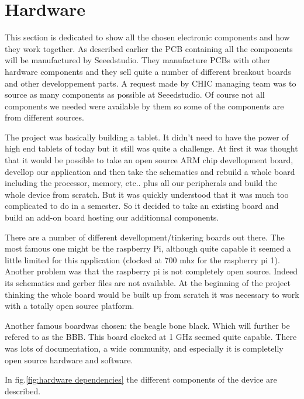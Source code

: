 \section{Hardware}

This section is dedicated to show all the chosen electronic components and how they work together. As described earlier the PCB containing all the components will be manufactured by Seeedstudio. They manufacture PCBs with other hardware components and they sell quite a number of different breakout boards and other developpement parts. A request made by CHIC managing team was to source as many components as possible at Seeedstudio. Of course not all components we needed were available by them so some of the components are from different sources.

The project was basically building a tablet. It didn't need to have the power of high end tablets of today but it still was quite a challenge. At first it was thought that it would be possible to take an open source ARM chip devellopment board, devellop our application and then take the schematics and rebuild a whole board including the processor, memory, etc.. plus all our peripherals and build the whole device from scratch. But it was quickly understood that it was much too complicated to do in a semester. So it decided to take an existing board and build an add-on board hosting our additionnal components.

There are a number of different devellopment/tinkering boards out there. The most famous one might be the raspberry Pi, although quite capable it seemed a little limited for this application (clocked at 700 mhz for the raspberry pi 1). Another problem was that the raspberry pi is not completely open source. Indeed its schematics and gerber files are not available. At the beginning of the project thinking the whole board would be built up from scratch it was necessary to work with a totally open source platform.

 Another famous boardwas chosen: the beagle bone black. Which will further be refered to as the BBB. This board clocked at 1 GHz seemed quite capable. There was lots of documentation, a wide community, and especially it is completelly open source hardware and software.

In fig.\ref{fig:hardware dependencies} the different components of the device are described.

